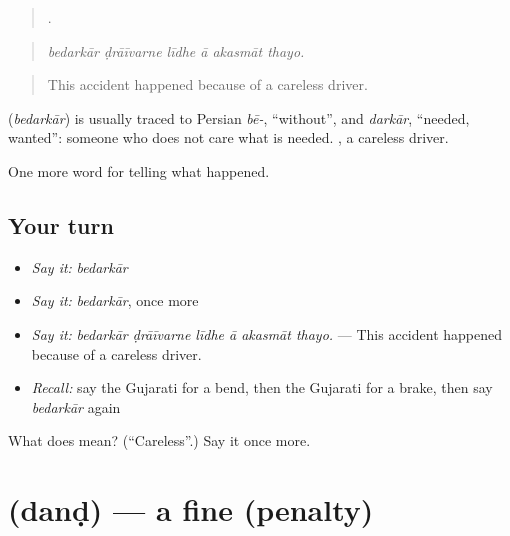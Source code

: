 \begin{quote}
     .
\end{quote}

\begin{quote}
\emph{bedarkār ḍrāīvarne līdhe ā akasmāt thayo.}
\end{quote}

\begin{quote}
This accident happened because of a careless driver.
\end{quote}

\begin{cousinweb}
\textbf{} (\emph{bedarkār}) is usually traced to Persian \emph{bē-}, \textquotedblleft{}without\textquotedblright{}, and \emph{darkār}, \textquotedblleft{}needed, wanted\textquotedblright{}: someone who does not care what is needed. \textbf{ }, a careless driver.
\end{cousinweb}

\begin{grammarlens}[title={What you've built}]
One more word for telling what happened.
\end{grammarlens}

\subsection*{Your turn}
\begin{itemize}
\raggedright
  \item \emph{Say it:} \emph{bedarkār}
  \item \emph{Say it:} \emph{bedarkār}, once more
  \item \emph{Say it:} \emph{bedarkār ḍrāīvarne līdhe ā akasmāt thayo.} — This accident happened because of a careless driver.
  \item \emph{Recall:} say the Gujarati for a bend, then the Gujarati for a brake, then say \emph{bedarkār} again
\end{itemize}

\begin{tcolorbox}[breakable,colback=teal!4,colframe=teal!35!black,title={Before you move on}]
What does  mean? (\textquotedblleft{}Careless\textquotedblright{}.) Say it once more.
\end{tcolorbox}
\section[\texorpdfstring{\gu{દંડ} (danḍ)}{દંડ (danḍ)}]{ (danḍ) — a fine (penalty)}

